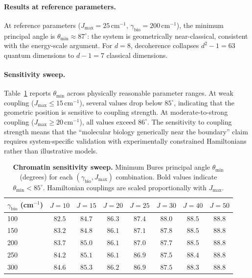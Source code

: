 \documentclass[12pt,a4paper]{article}
\theoremstyle{definition}
\theoremstyle{remark}
\begin{document}
\paragraph{Results at reference parameters.} At reference parameters ($J_{\max} = 25$\,cm$^{-1}$, $\gamma_{\mathrm{bio}} = 200$\,cm$^{-1}$), the minimum principal angle is $\theta_{\min} \approx 87^\circ$: the system is geometrically near-classical, consistent with the energy-scale argument. For $d = 8$, decoherence collapses $d^2 - 1 = 63$ quantum dimensions to $d - 1 = 7$ classical dimensions.

\paragraph{Sensitivity sweep.} Table~\ref{tab:chromatin-sweep} reports $\theta_{\min}$ across physically reasonable parameter ranges. At weak coupling ($J_{\max} \leq 15$\,cm$^{-1}$), several values drop below $85^\circ$, indicating that the geometric position is sensitive to coupling strength. At moderate-to-strong coupling ($J_{\max} \geq 20$\,cm$^{-1}$), all values exceed $86^\circ$. The sensitivity to coupling strength means that the ``molecular biology generically near the boundary'' claim requires system-specific validation with experimentally constrained Hamiltonians rather than illustrative models.

\begin{table}[H]
\centering
\caption{\textbf{Chromatin sensitivity sweep.} Minimum Bures principal angle $\theta_{\min}$ (degrees) for each $(\gamma_{\mathrm{bio}}, J_{\max})$ combination. Bold values indicate $\theta_{\min} < 85^\circ$. Hamiltonian couplings are scaled proportionally with $J_{\max}$.}
\label{tab:chromatin-sweep}
\smallskip
\begin{tabular}{l|ccccccc}
\hline
$\gamma_{\mathrm{bio}}$ (cm$^{-1}$) & $J{=}10$ & $J{=}15$ & $J{=}20$ & $J{=}25$ & $J{=}30$ & $J{=}40$ & $J{=}50$ \\
\hline
100 & $\mathbf{82.5}$ & $\mathbf{84.7}$ & $86.3$ & $87.4$ & $88.0$ & $88.5$ & $88.8$ \\
150 & $\mathbf{83.2}$ & $\mathbf{84.8}$ & $86.1$ & $87.1$ & $87.8$ & $88.5$ & $88.8$ \\
200 & $\mathbf{83.7}$ & $85.0$ & $86.1$ & $87.0$ & $87.7$ & $88.5$ & $88.8$ \\
250 & $\mathbf{84.2}$ & $85.1$ & $86.1$ & $86.9$ & $87.5$ & $88.4$ & $88.8$ \\
300 & $\mathbf{84.6}$ & $85.3$ & $86.2$ & $86.9$ & $87.5$ & $88.3$ & $88.8$ \\
\hline
\end{tabular}
\end{table}
\end{document}

